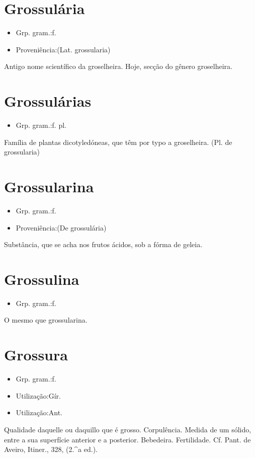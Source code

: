 \section{Grossulária}
\begin{itemize}
\item {Grp. gram.:f.}
\end{itemize}
\begin{itemize}
\item {Proveniência:(Lat. \textunderscore grossularia\textunderscore )}
\end{itemize}
Antigo nome scientífico da groselheira.
Hoje, secção do gênero groselheira.
\section{Grossulárias}
\begin{itemize}
\item {Grp. gram.:f. pl.}
\end{itemize}
Família de plantas dicotyledóneas, que têm por typo a groselheira.
(Pl. de \textunderscore grossularia\textunderscore )
\section{Grossularina}
\begin{itemize}
\item {Grp. gram.:f.}
\end{itemize}
\begin{itemize}
\item {Proveniência:(De \textunderscore grossulária\textunderscore )}
\end{itemize}
Substância, que se acha nos frutos ácidos, sob a fórma de geleia.
\section{Grossulina}
\begin{itemize}
\item {Grp. gram.:f.}
\end{itemize}
O mesmo que \textunderscore grossularina\textunderscore .
\section{Grossura}
\begin{itemize}
\item {Grp. gram.:f.}
\end{itemize}
\begin{itemize}
\item {Utilização:Gír.}
\end{itemize}
\begin{itemize}
\item {Utilização:Ant.}
\end{itemize}
Qualidade daquelle ou daquillo que é grosso.
Corpulência.
Medida de um sólido, entre a sua superfície anterior e a posterior.
Bebedeira.
Fertilidade. Cf. Pant. de Aveiro, \textunderscore Itiner.\textunderscore , 328, (2.^a ed.).
